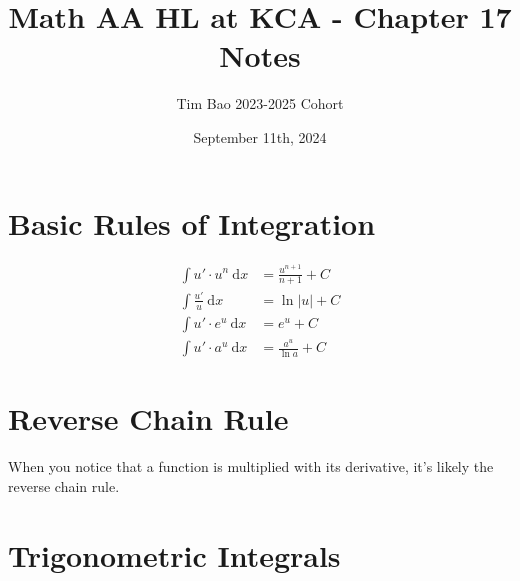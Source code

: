 \documentclass[11pt]{article}
\title{Math AA HL at KCA - Chapter 17 Notes}
\author{Tim Bao 2023-2025 Cohort}
\date{September 11th, 2024}
\newcommand{\dx}{\mathrm{~d}x}
\begin{document}
\maketitle
\pagebreak
\tableofcontents
\pagebreak

\section{Basic Rules of Integration}

\begin{large}
  \begin{align*}
    \int u' \cdot u^n \dx & = \frac{u^{n+1}}{n+1} + C \\
    \int \frac{u'}{u} \dx & = \ln |u| + C             \\
    \int u' \cdot e^u \dx & = e^u + C                 \\
    \int u' \cdot a^u \dx & = \frac{a^u}{\ln a} + C
  \end{align*}
\end{large}

\pagebreak

\section{Reverse Chain Rule}
When you notice that a function is multiplied with its derivative, it's likely the reverse chain rule.

\pagebreak

\section{Trigonometric Integrals}
\end{document}
